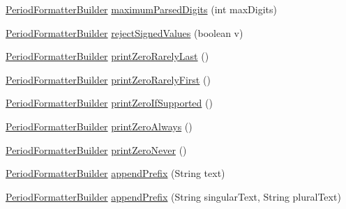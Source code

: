 \begin{DoxyCompactItemize}
\item 
\hyperlink{classorg_1_1joda_1_1time_1_1format_1_1_period_formatter_builder}{Period\-Formatter\-Builder} \hyperlink{classorg_1_1joda_1_1time_1_1format_1_1_period_formatter_builder_abe586130466ffe2c4ee19fac51be8059}{maximum\-Parsed\-Digits} (int max\-Digits)
\item 
\hyperlink{classorg_1_1joda_1_1time_1_1format_1_1_period_formatter_builder}{Period\-Formatter\-Builder} \hyperlink{classorg_1_1joda_1_1time_1_1format_1_1_period_formatter_builder_aa587a84df8679b880316827aae11ccee}{reject\-Signed\-Values} (boolean v)
\item 
\hyperlink{classorg_1_1joda_1_1time_1_1format_1_1_period_formatter_builder}{Period\-Formatter\-Builder} \hyperlink{classorg_1_1joda_1_1time_1_1format_1_1_period_formatter_builder_a92a932fc52e05d0114c52cc454b2d29c}{print\-Zero\-Rarely\-Last} ()
\item 
\hyperlink{classorg_1_1joda_1_1time_1_1format_1_1_period_formatter_builder}{Period\-Formatter\-Builder} \hyperlink{classorg_1_1joda_1_1time_1_1format_1_1_period_formatter_builder_aa5a705d393b18f5aad65e316c2a2bed4}{print\-Zero\-Rarely\-First} ()
\item 
\hyperlink{classorg_1_1joda_1_1time_1_1format_1_1_period_formatter_builder}{Period\-Formatter\-Builder} \hyperlink{classorg_1_1joda_1_1time_1_1format_1_1_period_formatter_builder_a9f0d0acfe01e9944477654ee2d26bc4b}{print\-Zero\-If\-Supported} ()
\item 
\hyperlink{classorg_1_1joda_1_1time_1_1format_1_1_period_formatter_builder}{Period\-Formatter\-Builder} \hyperlink{classorg_1_1joda_1_1time_1_1format_1_1_period_formatter_builder_a84ee2686fc1f658df23d9c44daa9a334}{print\-Zero\-Always} ()
\item 
\hyperlink{classorg_1_1joda_1_1time_1_1format_1_1_period_formatter_builder}{Period\-Formatter\-Builder} \hyperlink{classorg_1_1joda_1_1time_1_1format_1_1_period_formatter_builder_ab2f52284baef69e81751d3ee4bf02a41}{print\-Zero\-Never} ()
\item 
\hyperlink{classorg_1_1joda_1_1time_1_1format_1_1_period_formatter_builder}{Period\-Formatter\-Builder} \hyperlink{classorg_1_1joda_1_1time_1_1format_1_1_period_formatter_builder_a6c842fff415aa3db94d2c998debde471}{append\-Prefix} (String text)
\item 
\hyperlink{classorg_1_1joda_1_1time_1_1format_1_1_period_formatter_builder}{Period\-Formatter\-Builder} \hyperlink{classorg_1_1joda_1_1time_1_1format_1_1_period_formatter_builder_a1e9fe2567decf5299fb3391514316d25}{append\-Prefix} (String singular\-Text, String plural\-Text)

\end{DoxyCompactItemize}

